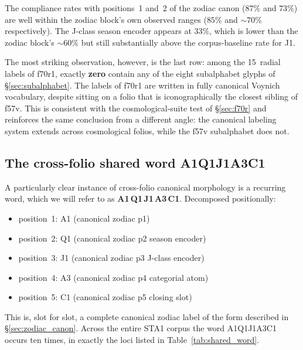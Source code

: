 The compliance rates with positions~1 and~2 of the zodiac canon
($87\%$ and $73\%$) are well within the zodiac block's own observed
ranges ($85\%$ and $\sim 70\%$ respectively). The J-class season
encoder appears at $33\%$, which is lower than the zodiac block's
$\sim 60\%$ but still substantially above the corpus-baseline rate
for J1.

The most striking observation, however, is the last row: among the
15~radial labels of f70r1, exactly \textbf{zero} contain any of the
eight subalphabet glyphs of \S\ref{sec:subalphabet}. The labels of
f70r1 are written in fully canonical Voynich vocabulary, despite
sitting on a folio that is iconographically the closest sibling of
f57v. This is consistent with the cosmological-suite test of
\S\ref{sec:f70r} and reinforces the same conclusion from a different
angle: the canonical labeling system extends across cosmological
folios, while the f57v subalphabet does not.

\subsection{The cross-folio shared word A1Q1J1A3C1}
\label{sec:shared_word}

A particularly clear instance of cross-folio canonical morphology is
a recurring word, which we will refer to as \textbf{A1\,Q1\,J1\,A3\,C1}.
Decomposed positionally:

\begin{itemize}[itemsep=0pt,topsep=2pt]
\item position~1: A1 (canonical zodiac p1)
\item position~2: Q1 (canonical zodiac p2 season encoder)
\item position~3: J1 (canonical zodiac p3 J-class encoder)
\item position~4: A3 (canonical zodiac p4 categorial atom)
\item position~5: C1 (canonical zodiac p5 closing slot)
\end{itemize}

This is, slot for slot, a complete canonical zodiac label of the form
described in \S\ref{sec:zodiac_canon}. Across the entire STA1 corpus
the word A1Q1J1A3C1 occurs ten times, in exactly the loci listed in
Table~\ref{tab:shared_word}.

